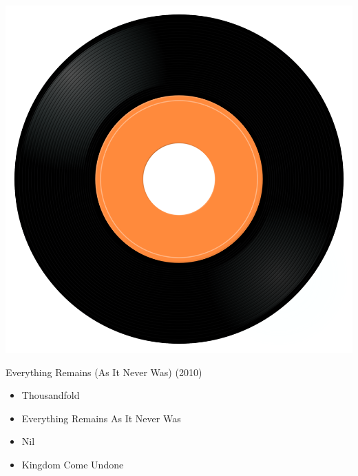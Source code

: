 \begin{minipage}[t]{0.25\textwidth}
\captionsetup{type=figure}
\includegraphics[width=\textwidth]{Images/cover.png}
\caption*{Everything Remains (As It Never Was) (2010)}
\end{minipage}
\begin{minipage}[t]{0.25\textwidth}\vspace{0pt}
\begin{itemize}[nosep,leftmargin=1em,labelwidth=*,align=left]
	\setlength{\itemsep}{0pt}
	\item Thousandfold
	\item Everything Remains As It Never Was
	\item Nil
	\item Kingdom Come Undone
\end{itemize}
\end{minipage}
